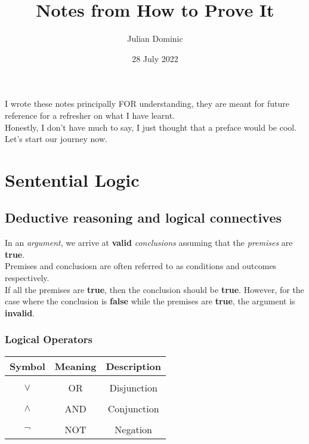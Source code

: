 \documentclass[../setup.tex]{subfiles}
\begin{document}
\title{Notes from How to Prove It}
\author{Julian Dominic}
\date{28 July 2022}
\maketitle
\clearpage

\newcommand{\prefacename}{Preface}
\newenvironment{preface}{
    {\noindent \bfseries \Huge \prefacename}
    \begin{center}
        \thispagestyle{plain}
    \end{center}%
}


\preface
I wrote these notes principally FOR understanding, they are meant for future reference for a refresher on what I have learnt. \\
Honestly, I don't have much to say, I just thought that a preface would be cool. Let's start our journey now.



\tableofcontents
{}
\clearpage

\setcounter{page}{1}



\section{Sentential Logic}
\subsection{Deductive reasoning and logical connectives}
In an \textit{argument}, we arrive at \textbf{valid} \textit{conclusions} assuming that the \textit{premises} are \textbf{true}. \\ 
Premises and conclusiosn are often referred to as conditions and outcomes respectively. \\
If all the premises are \textbf{true}, then the conclusion should be \textbf{true}. However, for the case where the conclusion is \textbf{false} while the premises are \textbf{true}, the argument is \textbf{invalid}.

\subsubsection{Logical Operators}
{
\centering
\begin{tabular}{| c | c | c |}
\hline
Symbol & Meaning & Description \\
\hline
& & \\
$\lor$ & OR & Disjunction \\
& & \\
$\land$ & AND & Conjunction \\
& & \\
$\lnot$ & NOT & Negation \\
\hline
\end{tabular} \\
}
\end{document}
